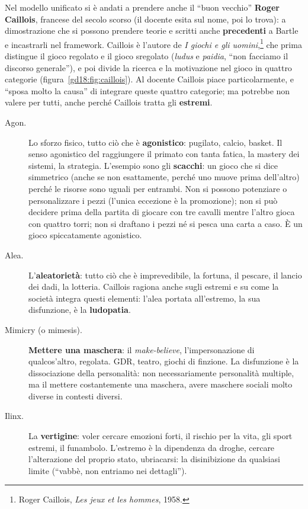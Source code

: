 Nel modello unificato si è andati a prendere anche il ``buon vecchio''
\textbf{Roger Caillois}, francese del secolo scorso (il docente esita sul nome, poi
lo trova): a dimostrazione che si possono prendere teorie e scritti anche
\textbf{precedenti} a Bartle e incastrarli nel framework. Caillois è l'autore de
\emph{I giochi e gli uomini},\footnote{Roger Caillois, \emph{Les jeux et les
hommes}, 1958.} che prima distingue il gioco regolato e il gioco sregolato
(\emph{ludus} e \emph{paidia}, ``non facciamo il discorso generale''), e poi divide
la ricerca e la motivazione nel gioco in quattro categorie
(figura~\ref{gd18:fig:caillois}). Al docente Caillois piace particolarmente, e
``sposa molto la causa'' di integrare queste quattro categorie; ma potrebbe non
valere per tutti, anche perché Caillois tratta gli \textbf{estremi}.

\begin{description}
  \item[Agon.] Lo sforzo fisico, tutto ciò che è \textbf{agonistico}: pugilato,
        calcio, basket. Il senso agonistico del raggiungere il primato con tanta
        fatica, la mastery dei sistemi, la strategia. L'esempio sono gli
        \textbf{scacchi}: un gioco che si dice simmetrico (anche se non esattamente,
        perché uno muove prima dell'altro) perché le risorse sono uguali per
        entrambi. Non si possono potenziare o personalizzare i pezzi (l'unica
        eccezione è la promozione); non si può decidere prima della partita di
        giocare con tre cavalli mentre l'altro gioca con quattro torri; non si
        draftano i pezzi né si pesca una carta a caso. È un gioco spiccatamente
        agonistico.
  \item[Alea.] L'\textbf{aleatorietà}: tutto ciò che è imprevedibile, la fortuna, il
        pescare, il lancio dei dadi, la lotteria. Caillois ragiona anche sugli
        estremi e su come la società integra questi elementi: l'alea portata
        all'estremo, la sua disfunzione, è la \textbf{ludopatia}.
  \item[Mimicry (o mimesis).] \textbf{Mettere una maschera}: il
        \emph{make-believe}, l'impersonazione di qualcos'altro, regolata. GDR,
        teatro, giochi di finzione. La disfunzione è la dissociazione della
        personalità: non necessariamente personalità multiple, ma il mettere
        costantemente una maschera, avere maschere sociali molto diverse in contesti
        diversi.
  \item[Ilinx.] La \textbf{vertigine}: voler cercare emozioni forti, il rischio per
        la vita, gli sport estremi, il funambolo. L'estremo è la dipendenza da
        droghe, cercare l'alterazione del proprio stato, ubriacarsi: la
        disinibizione da qualsiasi limite (``vabbè, non entriamo nei dettagli'').
\end{description}

